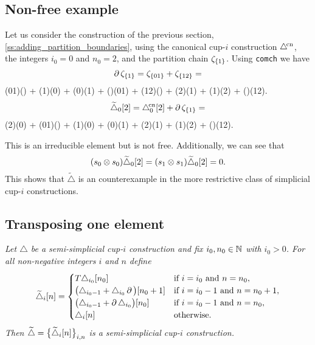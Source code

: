 \subsection{Non-free example}

Let us consider the construction of the previous section, \cref{ss:adding_partition_boundaries}, using the canonical \mbox{cup-$i$} construction $\canonical$, the integers $i_0 = 0$ and $n_0 = 2$, and the partition chain $\zeta_{\set{1}}$.
Using \texttt{comch} we have
\[
\bd \zeta_{\set{1}} = \zeta_{\set{01}} + \zeta_{\set{12}} =
\]
\noindent
{\ttfamily (01)() + (1)(0) + (0)(1) + ()(01) + (12)() + (2)(1) + (1)(2) + ()(12).}
\[
\widetilde\triangle_0[2] = \canonical_0[2] + \bd \zeta_{\set{1}} =
\]
\noindent
{\ttfamily (2)(0) + (01)() + (1)(0) + (0)(1) + (2)(1) + (1)(2) + ()(12)}.

\medskip \noindent This is an irreducible element but is not free.
Additionally, we can see that
\[
(s_0 \ot s_0)\widetilde\triangle_0[2] = (s_1 \ot s_1)\widetilde\triangle_0[2] = 0.
\]
This shows that $\widetilde{\triangle}$ is an counterexample in the more restrictive class of simplicial cup-$i$ constructions.


\subsection{Transposing one element}

\textit{
	Let $\triangle$ be a semi-simplicial \mbox{cup-$i$} construction and fix $i_0, n_0 \in \N$ with $i_0 > 0$.
	For all non-negative integers $i$ and $n$ define
	\[
	\widetilde\triangle_i[n] =
	\begin{cases}
		T\triangle_{i_0}[n_0] & \text{if }i=i_0 \text{ and } n=n_0, \\
		\big(\triangle_{i_0-1} + \triangle_{i_0}\bd\big)[n_0+1] & \text{if }i=i_0-1 \text{ and } n=n_0+1, \\
		\big(\triangle_{i_0-1} + \bd\triangle_{i_0}\big)[n_0] & \text{if }i=i_0-1 \text{ and } n=n_0, \\
		\triangle_{i}[n] & \text{otherwise}.
	\end{cases}
	\]
	Then $\widetilde\triangle = \set[\big]{\widetilde\triangle_i[n]}_{i,n}$ is a semi-simplicial \mbox{cup-$i$} construction.
}

